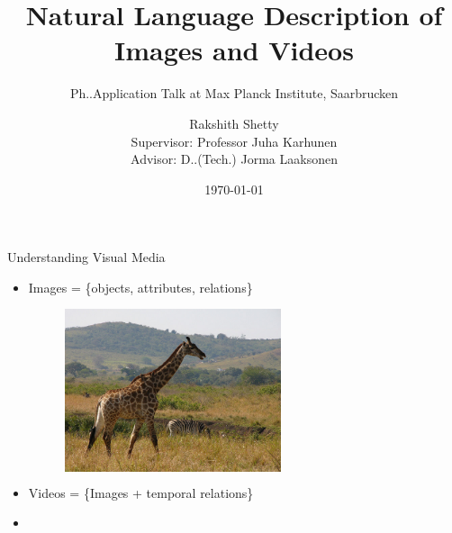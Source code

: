 \documentclass{beamer}
\begin{document}

\title{Natural Language Description of \\Images and Videos}
\subtitle{Ph.\@D.\@ Application Talk at Max Planck Institute, Saarbrucken}
\author[Rakshith Shetty]{Rakshith Shetty\\[4mm] {\small Supervisor: Professor Juha Karhunen\\ Advisor: D.\@Sc.\@ (Tech.\@) Jorma Laaksonen}}
\date{\today}

\frame{\titlepage} 



\begin{frame}{Understanding Visual Media}
  \begin{itemize}
  \item<1-> Images = \{objects, attributes, relations\}\\
  \begin{figure}[h]
    \begin{columns}
    \hfill\includegraphics[width=0.6\textwidth]{images/COCO_train2014_000000544856.jpg}
    \hspace{-5mm}
    \centering
    \caption{}
    \end{columns}
  \end{figure}
  \item<2->Videos = \{Images + temporal relations\}\\[4mm]
  \item<3->
  \end{itemize}
\end{frame}
\end{document}
